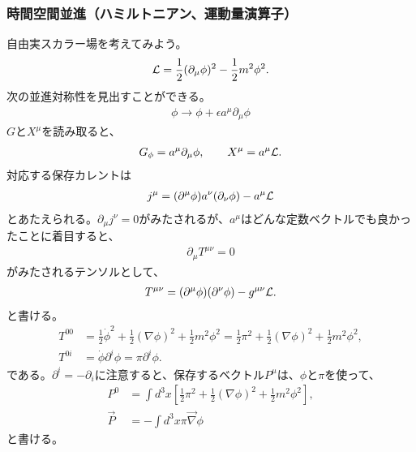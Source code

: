 \documentclass[10pt,a4paper]{jarticle}
\begin{document}
\subsubsection{時間空間並進（ハミルトニアン、運動量演算子）}
自由実スカラー場を考えてみよう。
\begin{align}
{\cal L} = \frac{1}{2}(\partial_\mu \phi)^2 - \frac{1}{2}m^2 \phi^2.
\end{align}
%
次の並進対称性を見出すことができる。
\begin{align}
\phi \to \phi + \epsilon a^\mu \partial_\mu \phi
\end{align}
%
$G$と$X^\mu$を読み取ると、
\begin{align}
G_\phi = a^\mu \partial_\mu \phi, \qquad
X^\mu = a^\mu {\cal L}.
\end{align}
%
対応する保存カレントは
\begin{align}
j^\mu = (\partial^\mu \phi) a^\nu (\partial_\nu \phi) - a^\mu {\cal L}
\end{align}
とあたえられる。$\partial_\mu j^\nu = 0$がみたされるが、$a^\mu$はどんな定数ベクトルでも良かったことに着目すると、
\begin{align}
\partial_\mu T^{\mu\nu} = 0
\end{align}
がみたされるテンソルとして、
\begin{align}
T^{\mu\nu} = (\partial^\mu \phi) (\partial^\nu \phi) - g^{\mu\nu} {\cal L}.
\end{align}
と書ける。
\begin{align}
T^{00}
&= \frac{1}{2} \dot\phi^2 + \frac{1}{2}(\nabla\phi)^2 + \frac{1}{2}m^2 \phi^2
= \frac{1}{2} \pi^2 + \frac{1}{2}(\nabla\phi)^2 + \frac{1}{2}m^2 \phi^2, \\
T^{0i}
&= \dot\phi \partial^i\phi = \pi \partial^i \phi.
\end{align}
である。$\partial^i = -\partial_i$に注意すると、保存するベクトル$P^\mu$は、$\phi$と$\pi$を使って、
\begin{align}
P^0 &= \int d^3x \left[ \frac{1}{2} \pi^2 + \frac{1}{2}(\nabla\phi)^2 + \frac{1}{2}m^2 \phi^2 \right], \\
\vec P &= -\int d^3x \pi \vec\nabla \phi
\end{align}
と書ける。
\end{document}
